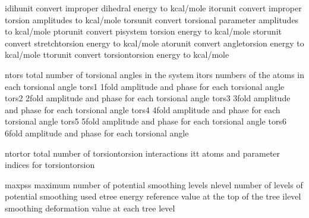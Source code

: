 \documentclass[letterpaper,11pt,english]{sphinxmanual}
\begin{document}

\begin{sphinxVerbatim}[commandchars=\\\{\}]
idihunit        convert improper dihedral energy to kcal/mole
itorunit        convert improper torsion amplitudes to kcal/mole
torsunit        convert torsional parameter amplitudes to kcal/mole
ptorunit        convert pi\PYGZhy{}system torsion energy to kcal/mole
storunit        convert stretch\PYGZhy{}torsion energy to kcal/mole
atorunit        convert angle\PYGZhy{}torsion energy to kcal/mole
ttorunit        convert torsion\PYGZhy{}torsion energy to kcal/mole
\end{sphinxVerbatim}


\begin{sphinxVerbatim}[commandchars=\\\{\}]
ntors           total number of torsional angles in the system
itors           numbers of the atoms in each torsional angle
tors1           1\PYGZhy{}fold amplitude and phase for each torsional angle
tors2           2\PYGZhy{}fold amplitude and phase for each torsional angle
tors3           3\PYGZhy{}fold amplitude and phase for each torsional angle
tors4           4\PYGZhy{}fold amplitude and phase for each torsional angle
tors5           5\PYGZhy{}fold amplitude and phase for each torsional angle
tors6           6\PYGZhy{}fold amplitude and phase for each torsional angle
\end{sphinxVerbatim}


\begin{sphinxVerbatim}[commandchars=\\\{\}]
ntortor         total number of torsion\PYGZhy{}torsion interactions
itt             atoms and parameter indices for torsion\PYGZhy{}torsion
\end{sphinxVerbatim}


\begin{sphinxVerbatim}[commandchars=\\\{\}]
maxpss          maximum number of potential smoothing levels
nlevel          number of levels of potential smoothing used
etree           energy reference value at the top of the tree
ilevel          smoothing deformation value at each tree level
\end{sphinxVerbatim}
\end{document}
